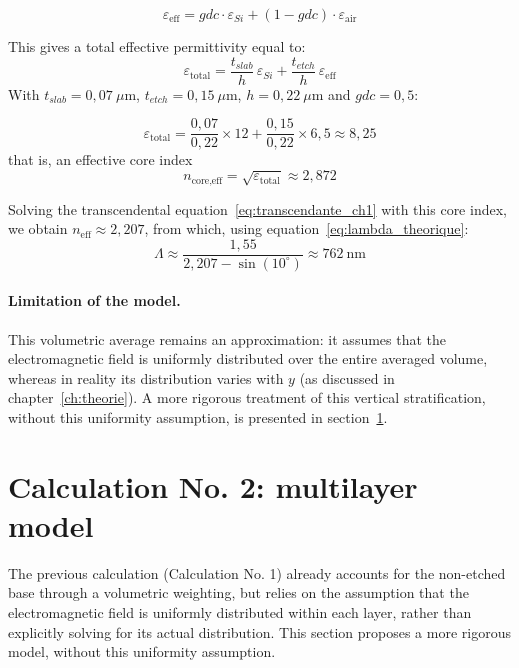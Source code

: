 \documentclass[a4paper,11pt]{report}
\begin{document}
\begin{equation}
\varepsilon_{\text{eff}} = gdc\cdot\varepsilon_{Si} + (1-gdc)\cdot\varepsilon_{\text{air}}
\end{equation}

This gives a total effective permittivity equal to:
\begin{equation}
\varepsilon_{\text{total}} = \frac{t_{slab}}{h}\,\varepsilon_{Si} + \frac{t_{etch}}{h}\,\varepsilon_{\text{eff}}
\end{equation}
With $t_{slab}=0{,}07~\mu\text{m}$, $t_{etch}=0{,}15~\mu\text{m}$, $h=0{,}22~\mu\text{m}$ and $gdc=0{,}5$:

\begin{equation}
\varepsilon_{\text{total}} = \frac{0{,}07}{0{,}22}\times12 + \frac{0{,}15}{0{,}22}\times6{,}5 \approx 8{,}25
\end{equation}
that is, an effective core index
\begin{equation}
n_{\text{core,eff}} = \sqrt{\varepsilon_{\text{total}}} \approx 2{,}872
\end{equation}

Solving the transcendental equation~\eqref{eq:transcendante_ch1} with this core index, we obtain $n_{\text{eff}}\approx2{,}207$, from which, using equation~\eqref{eq:lambda_theorique}:
\begin{equation}
\Lambda \approx \frac{1{,}55}{2{,}207-\sin(10^\circ)} \approx 762~\text{nm}
\end{equation}

\paragraph{Limitation of the model.} This volumetric average remains an approximation: it assumes that the electromagnetic field is uniformly distributed over the entire averaged volume, whereas in reality its distribution varies with $y$ (as discussed in chapter~\ref{ch:theorie}). A more rigorous treatment of this vertical stratification, without this uniformity assumption, is presented in section~\ref{sec:calcul2}. 

\section{Calculation No. 2: multilayer model}
\label{sec:calcul2}

The previous calculation (Calculation No. 1) already accounts for the non-etched base through a volumetric weighting, but relies on the assumption that the electromagnetic field is uniformly distributed within each layer, rather than explicitly solving for its actual distribution. This section proposes a more rigorous model, without this uniformity assumption.
\end{document}
